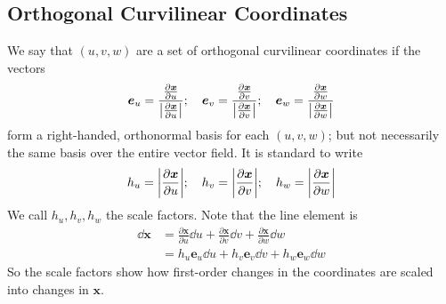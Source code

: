 \documentclass{article}
\begin{document}
\subsection{Orthogonal Curvilinear Coordinates}
We say that $(u, v, w)$ are a set of orthogonal curvilinear coordinates if the vectors
\[ \bm e_u = \frac{\frac{\partial \bm x}{\partial u}}{\abs{\frac{\partial \bm x}{\partial u}}};\quad \bm e_v = \frac{\frac{\partial \bm x}{\partial v}}{\abs{\frac{\partial \bm x}{\partial v}}};\quad \bm e_w = \frac{\frac{\partial \bm x}{\partial w}}{\abs{\frac{\partial \bm x}{\partial w}}} \]
form a right-handed, orthonormal basis for each $(u, v, w)$; but not necessarily the same basis over the entire vector field. It is standard to write
\[ h_u = \abs{\frac{\partial \bm x}{\partial u}};\quad h_v = \abs{\frac{\partial \bm x}{\partial v}};\quad h_w = \abs{\frac{\partial \bm x}{\partial w}} \]
We call $h_u, h_v, h_w$ the scale factors.  Note that the line element is
\begin{align*}
    \dd \bm x & = \frac{\partial \bm x}{\partial u}\dd u + \frac{\partial \bm x}{\partial v}\dd v + \frac{\partial \bm x}{\partial w} \dd w \\
              & = h_u \bm e_u \dd u + h_v \bm e_v \dd v + h_w \bm e_w \dd w
\end{align*}
So the scale factors show how first-order changes in the coordinates are scaled into changes in $\bm x$.
\end{document}
